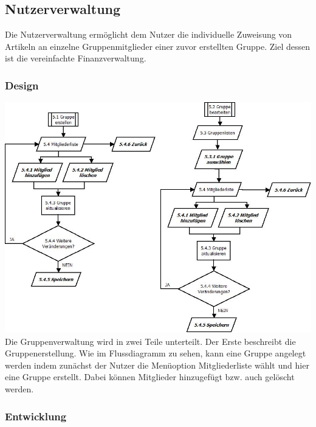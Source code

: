 \documentclass[12pt,a4paper]{article}
\begin{document}
\subsection{Nutzerverwaltung}
Die Nutzerverwaltung ermöglicht dem Nutzer die individuelle Zuweisung von Artikeln an einzelne Gruppenmitglieder einer zuvor erstellten Gruppe. Ziel dessen ist die vereinfachte Finanzverwaltung.

\subsubsection*{Design}
\includegraphics[scale=0.6, origin=l]{Gruppenverwaltung.jpeg}
\newline
\newline
Die Gruppenverwaltung wird in zwei Teile unterteilt. Der Erste beschreibt die Gruppenerstellung. Wie im Flussdiagramm zu sehen, kann eine Gruppe angelegt werden indem zunächst der Nutzer die Menüoption Mitgliederliste wählt und hier eine Gruppe erstellt. Dabei können Mitglieder hinzugefügt bzw. auch gelöscht werden.
\subsubsection*{Entwicklung}
\newpage
\end{document}
